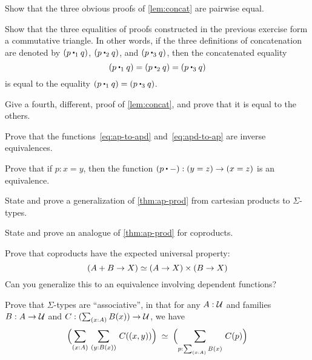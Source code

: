 \sectionExercises

\begin{ex}\label{ex:basics:concat}
  Show that the three obvious proofs of \autoref{lem:concat} are pairwise equal.
\end{ex}

\begin{ex}
  Show that the three equalities of proofs constructed in the previous exercise form a commutative triangle.
  In other words, if the three definitions of concatenation are denoted by $(p \mathbin{\ct_1} q)$, $(p\mathbin{\ct_2} q)$, and $(p\mathbin{\ct_3} q)$, then the concatenated equality
  \[(p\mathbin{\ct_1} q) = (p\mathbin{\ct_2} q) = (p\mathbin{\ct_3} q)\]
  is equal to the equality $(p\mathbin{\ct_1} q) = (p\mathbin{\ct_3} q)$.
\end{ex}

\begin{ex}
  Give a fourth, different, proof of \autoref{lem:concat}, and prove that it is equal to the others.
\end{ex}

\begin{ex}
  Prove that the functions~\eqref{eq:ap-to-apd} and~\eqref{eq:apd-to-ap} are inverse equivalences.
\end{ex}

\begin{ex}\label{ex:equiv-concat}
  Prove that if $p:x=y$, then the function $(p\ct {-}):(y=z) \to (x=z)$ is an equivalence.
\end{ex}

\begin{ex}\label{ex:ap-sigma}
  State and prove a generalization of \autoref{thm:ap-prod} from cartesian products to $\Sigma$-types.
\end{ex}

\begin{ex}
  State and prove an analogue of \autoref{thm:ap-prod} for coproducts.
\end{ex}

\begin{ex}\label{ex:coprod-ump}
  Prove that coproducts have the expected universal property:
  \[ (A+B \to X) \simeq (A\to X)\times (B\to X) \]
  Can you generalize this to an equivalence involving dependent functions?
\end{ex}

\begin{ex}\label{ex:sigma-assoc}
  Prove that $\Sigma$-types are ``associative'', in that for any $A:\mathcal{U}$ and families $B:A\to\mathcal{U}$ and $C:(\sm{x:A} B(x))\to\UU$, we have
  \[\eqvspaced{\Parens{\sm{x:A}{y:B(x)} C(\pairr{x,y})}}{\Parens{\sm{p:\sm{x:A}B(x)} C(p)}} \]
\end{ex}

